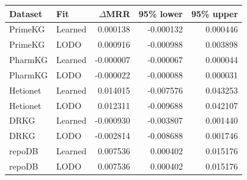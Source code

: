 \begin{tabular}{llrrr}
\toprule
Dataset & Fit & $\Delta$MRR & 95\% lower & 95\% upper \\
\midrule
PrimeKG & Learned & 0.000138 & -0.000132 & 0.000446 \\
PrimeKG & LODO & 0.000916 & -0.000988 & 0.003898 \\
PharmKG & Learned & -0.000007 & -0.000067 & 0.000044 \\
PharmKG & LODO & -0.000022 & -0.000088 & 0.000031 \\
Hetionet & Learned & 0.014015 & -0.007576 & 0.043253 \\
Hetionet & LODO & 0.012311 & -0.009688 & 0.042107 \\
DRKG & Learned & -0.000930 & -0.003807 & 0.001440 \\
DRKG & LODO & -0.002814 & -0.008688 & 0.001746 \\
repoDB & Learned & 0.007536 & 0.000402 & 0.015176 \\
repoDB & LODO & 0.007536 & 0.000402 & 0.015176 \\
\bottomrule
\end{tabular}
